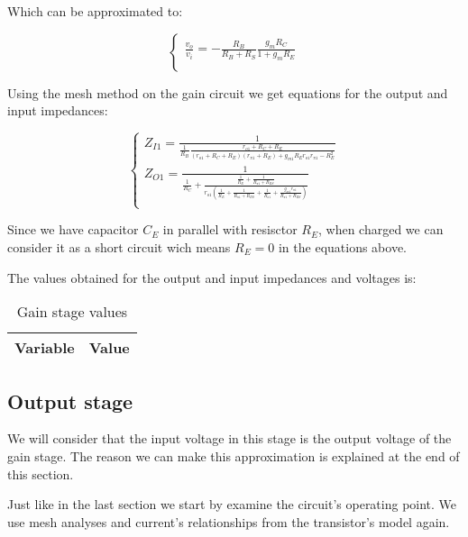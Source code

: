 Which can be approximated to:

\begin{equation}\label{eq:vs1}
\begin{cases}
\frac{v_o}{v_i}=-\frac{R_B}{R_B+R_S} \frac{g_m R_C}{1+g_m R_E}\\
\end{cases}
\end{equation}

 Using the mesh method on the gain circuit we get equations for the output and input impedances:
 
 \begin{equation}\label{eq:Z1}
\begin{cases}
Z_{I1}=\frac{1}{\frac{1}{R_B} \frac{r_{o1}+R_{C}+R_{E}}{(r_{o1}+R_{C}+R_{E})(r_{\pi 1}+R_{E})+g_{m1} R_{E} r_{o1} r_{\pi 1} - R_{E}^2}}\\
Z_{O1}= \frac{1}{\frac{1}{R_C} +\frac{\frac{1}{R_E}+\frac{1}{R_{\pi 1}+R_{BS}}}{r_{o1}(\frac{1}{R_E}+\frac{1}{R_{\pi 1}+R_{BS}}+\frac{1}{R_{o1}}+ \frac{g_{m1} r_{\pi 1}}{R_{\pi 1}+R_{BS}})}}\\
\end{cases}
\end{equation}

 Since we have capacitor $C_E$ in parallel with resisctor $R_E$, when charged we can consider it as a short circuit wich means $R_E=0$ in the equations above.
 \par
The values obtained for the output and input impedances and voltages is:

\begin{table}[H]
  \centering
  \begin{tabular}{|l|r|}
    \hline    
    {\bf Variable} & {\bf Value} \\ \hline
    
  \end{tabular}
  \caption{Gain stage values}
  \label{tab:sim1}
\end{table}

\subsection{Output stage}
We will consider that the input voltage in this stage is the output voltage of the gain stage. The reason we can make this approximation is explained at the end of this section.
\par
Just like in the last section we start by examine the circuit's operating point.  We use mesh analyses and current's relationships from the transistor's model again.

